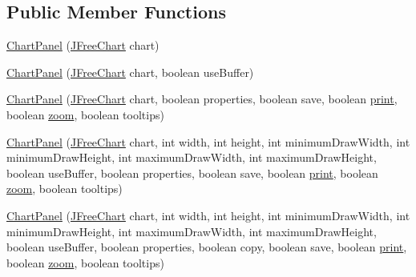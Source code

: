 \subsection*{Public Member Functions}
\begin{DoxyCompactItemize}
\item 
\mbox{\hyperlink{classorg_1_1jfree_1_1chart_1_1_chart_panel_afe98d95369c1544590392fc33db8ae30}{Chart\+Panel}} (\mbox{\hyperlink{classorg_1_1jfree_1_1chart_1_1_j_free_chart}{J\+Free\+Chart}} chart)
\item 
\mbox{\hyperlink{classorg_1_1jfree_1_1chart_1_1_chart_panel_af6a83f80e906f5d3383280ca8689bf34}{Chart\+Panel}} (\mbox{\hyperlink{classorg_1_1jfree_1_1chart_1_1_j_free_chart}{J\+Free\+Chart}} chart, boolean use\+Buffer)
\item 
\mbox{\hyperlink{classorg_1_1jfree_1_1chart_1_1_chart_panel_ac91baefa957a8fa5153fc65d6962fe8e}{Chart\+Panel}} (\mbox{\hyperlink{classorg_1_1jfree_1_1chart_1_1_j_free_chart}{J\+Free\+Chart}} chart, boolean properties, boolean save, boolean \mbox{\hyperlink{classorg_1_1jfree_1_1chart_1_1_chart_panel_a5d268d825853e74d978f93bd962c87a9}{print}}, boolean \mbox{\hyperlink{classorg_1_1jfree_1_1chart_1_1_chart_panel_a38d1f7fc6721aef92a30c0b79ecdaed9}{zoom}}, boolean tooltips)
\item 
\mbox{\hyperlink{classorg_1_1jfree_1_1chart_1_1_chart_panel_a71c57bd5bb22318d3345d993e92f5349}{Chart\+Panel}} (\mbox{\hyperlink{classorg_1_1jfree_1_1chart_1_1_j_free_chart}{J\+Free\+Chart}} chart, int width, int height, int minimum\+Draw\+Width, int minimum\+Draw\+Height, int maximum\+Draw\+Width, int maximum\+Draw\+Height, boolean use\+Buffer, boolean properties, boolean save, boolean \mbox{\hyperlink{classorg_1_1jfree_1_1chart_1_1_chart_panel_a5d268d825853e74d978f93bd962c87a9}{print}}, boolean \mbox{\hyperlink{classorg_1_1jfree_1_1chart_1_1_chart_panel_a38d1f7fc6721aef92a30c0b79ecdaed9}{zoom}}, boolean tooltips)
\item 
\mbox{\hyperlink{classorg_1_1jfree_1_1chart_1_1_chart_panel_adeab0d58f6e8e1fe8d9110b755d3b1fe}{Chart\+Panel}} (\mbox{\hyperlink{classorg_1_1jfree_1_1chart_1_1_j_free_chart}{J\+Free\+Chart}} chart, int width, int height, int minimum\+Draw\+Width, int minimum\+Draw\+Height, int maximum\+Draw\+Width, int maximum\+Draw\+Height, boolean use\+Buffer, boolean properties, boolean copy, boolean save, boolean \mbox{\hyperlink{classorg_1_1jfree_1_1chart_1_1_chart_panel_a5d268d825853e74d978f93bd962c87a9}{print}}, boolean \mbox{\hyperlink{classorg_1_1jfree_1_1chart_1_1_chart_panel_a38d1f7fc6721aef92a30c0b79ecdaed9}{zoom}}, boolean tooltips)

\end{DoxyCompactItemize}
